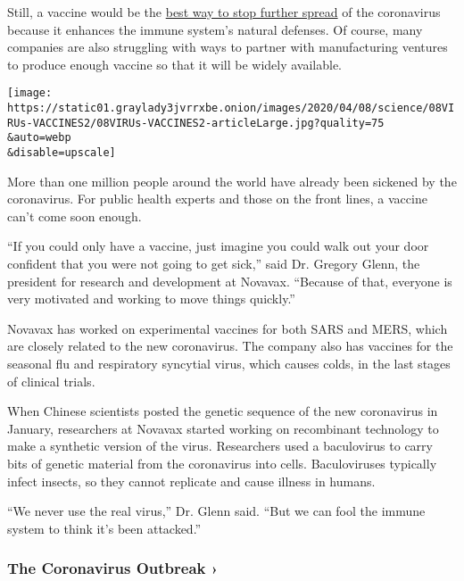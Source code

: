Still, a vaccine would be the
\href{https://www.nytimes3xbfgragh.onion/2020/01/28/health/coronavirus-vaccine.html}{best
way to stop further spread} of the coronavirus because it enhances the
immune system's natural defenses. Of course, many companies are also
struggling with ways to partner with manufacturing ventures to produce
enough vaccine so that it will be widely available.

\texttt{[image: https://static01.graylady3jvrrxbe.onion/images/2020/04/08/science/08VIRUs-VACCINES2/08VIRUs-VACCINES2-articleLarge.jpg?quality=75\\\&auto=webp\\\&disable=upscale]}

More than one million people around the world have already been sickened
by the coronavirus. For public health experts and those on the front
lines, a vaccine can't come soon enough.

``If you could only have a vaccine, just imagine you could walk out your
door confident that you were not going to get sick,'' said Dr. Gregory
Glenn, the president for research and development at Novavax. ``Because
of that, everyone is very motivated and working to move things
quickly.''

Novavax has worked on experimental vaccines for both SARS and MERS,
which are closely related to the new coronavirus. The company also has
vaccines for the seasonal flu and respiratory syncytial virus, which
causes colds, in the last stages of clinical trials.

When Chinese scientists posted the genetic sequence of the new
coronavirus in January, researchers at Novavax started working on
recombinant technology to make a synthetic version of the virus.
Researchers used a baculovirus to carry bits of genetic material from
the coronavirus into cells. Baculoviruses typically infect insects, so
they cannot replicate and cause illness in humans.

``We never use the real virus,'' Dr. Glenn said. ``But we can fool the
immune system to think it's been attacked.''

\href{https://www.nytimes3xbfgragh.onion/news-event/coronavirus?action=click\&pgtype=Article\&state=default\&region=MAIN_CONTENT_3\&context=storylines_faq}{}

\hypertarget{the-coronavirus-outbreak-}{%
\subsubsection{The Coronavirus Outbreak
›}\label{the-coronavirus-outbreak-}}

